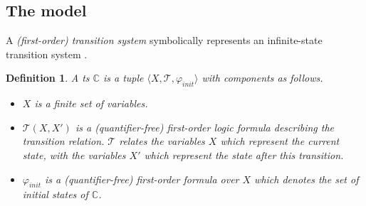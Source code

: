 \documentclass[letterpaper, 10 pt, conference]{ieeeconf}
\newtheorem{definition}{Definition}
\begin{document}
\subsection{The model}
\label{subsec:model}
A \emph{(first-order) transition system} symbolically represents an
infinite-state transition system \cite{cimatti2012smt}.
\begin{definition}
A \ac{ts} $\mathbb{C}$ is a tuple $\langle
X, \mathcal{T}, \varphi_{init}\rangle $ with components as follows.
\begin{itemize}
\item $X$ is a finite set of variables. 

\item $\mathcal{T} (X,X')$ is a (quantifier-free) first-order logic formula describing the
  transition relation. $\mathcal{T}$ relates the variables
  $X$ which represent the \emph{current} state, with the
  variables $X'$ which represent the state after this
  transition.
 
\item $\varphi_{init}$ is a (quantifier-free) first-order formula over $X$
  which denotes the set of initial states  of
  $\mathbb{C}$. \end{itemize}
\end{definition}
\end{document}
